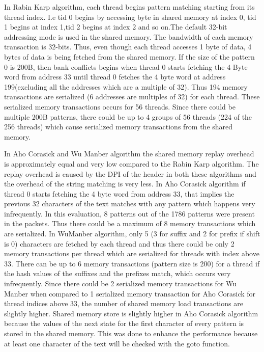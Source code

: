 In Rabin Karp algorithm, each thread begins pattern matching starting from its thread index. 
I.e tid 0 begins by accessing byte in shared memory at index 0, tid 1 begins at index 1,tid 2 begins at index 2 and so on.The default 32-bit addressing mode is used in the shared memory.
The bandwidth of each memory transaction is 32-bits. Thus, even though each thread accesses 1 byte of data, 4 bytes of data is being fetched from the shared memory. If the size of the pattern 0 is 200B, then bank conflicts begins when thread 0 starts fetching the 4 Byte word from address 33 until thread 0 fetches the 4 byte word at address 199(excluding all the addresses which are a multiple of 32). Thus 194 memory transactions are serialized (6 addresses are multiples of 32) for each thread. These serialized memory transactions occurs for 56 threads. Since there could be multiple 200B patterns, there could be up to 4 groups of  56 threads (224 of the 256 threads) which cause serialized memory transactions from the shared memory.

In Aho Corasick and Wu Manber algorithm the shared memory replay overhead is approximately equal  and very low compared to the Rabin Karp algorithm. The replay overhead is caused by the DPI of the header in both these algorithms and the overhead of the string matching is very less. In Aho Corasick algorithm if thread 0 starts fetching the 4 byte word from address 33, that implies the previous 32 characters of the text matches with any pattern which happens very infrequently. In this evaluation, 8 patterns out of the 1786 patterns were present in the packets. Thus there could be a maximum of 8 memory transactions which are serialized.
In WuManber algorithm, only 5 (3 for suffix and 2 for prefix if shift is 0) characters are fetched by each thread and thus there could be only 2 memory transactions per thread which are serialized for threads with index above 33. There can be up to 6 memory transactions (pattern size is 200) for a thread if the hash values of the suffixes and the prefixes match, which occurs very infrequently. Since there could be 2 serialized memory transactions for Wu Manber when compared to 1 serialized memory transaction for Aho Corasick for thread indices above 33, the number of shared memory load transactions are slightly higher. Shared memory store is slightly higher in Aho Corasick algorithm because the values of the next state for the first character of every pattern is stored in the shared memory. This was done to enhance the performance because at least one character of the text will be checked with the goto function.

